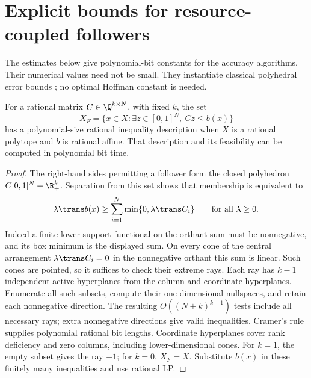 \section{Explicit bounds for resource-coupled followers}
\label{app:quantitative}

The estimates below give polynomial-bit constants for the accuracy
algorithms. Their numerical values need not be small. They instantiate
classical polyhedral error bounds \cite{Hoffman1952}; no optimal Hoffman
constant is needed.

\begin{lemma}\label{lem:resource-projection}
For a rational matrix $C\in\Q^{k\times N}$, with fixed $k$, the set
\[
 X_F=\{x\in X:\exists z\in[0,1]^N,\ Cz\le b(x)\}
\]
has a polynomial-size rational inequality description when $X$ is a
rational polytope and $b$ is rational affine. That description and its
feasibility can be computed in polynomial bit time.
\end{lemma}
\begin{proof}
The right-hand sides permitting a follower form the closed polyhedron
$C[0,1]^N+\R_+^k$. Separation from this set shows that membership is
equivalent to
\begin{equation}\label{eq:resource-support}
 \lambda\trans b(x)\ge\sum_{i=1}^N\min\{0,\lambda\trans C_i\}
                              \qquad\text{for all }\lambda\ge0.
\end{equation}
Indeed a finite lower support functional on the orthant sum must be
nonnegative, and its box minimum is the displayed sum. On every cone
of the central arrangement $\lambda\trans C_i=0$ in the nonnegative
orthant this sum is linear. Such cones are pointed, so it suffices to
check their extreme rays. Each ray has $k-1$ independent active
hyperplanes from the column and coordinate hyperplanes. Enumerate all
such subsets, compute their one-dimensional nullspaces, and retain
each nonnegative direction. The resulting
$O((N+k)^{k-1})$ tests include all necessary rays; extra nonnegative
directions give valid inequalities. Cramer's rule supplies polynomial
rational bit lengths. Coordinate hyperplanes cover rank deficiency and
zero columns, including lower-dimensional cones. For $k=1$, the empty
subset gives the ray $+1$; for $k=0$, $X_F=X$. Substitute $b(x)$
in these finitely many inequalities and use rational LP.
\end{proof}

